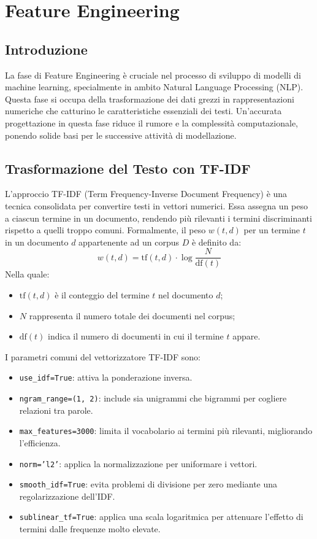 
\chapter{Feature Engineering}

\section{Introduzione}
La fase di Feature Engineering è cruciale nel processo di sviluppo di modelli di machine learning, specialmente in ambito Natural Language Processing (NLP). Questa fase si occupa della trasformazione dei dati grezzi in rappresentazioni numeriche che catturino le caratteristiche essenziali dei testi. Un’accurata progettazione in questa fase riduce il rumore e la complessità computazionale, ponendo solide basi per le successive attività di modellazione.

\section{Trasformazione del Testo con TF-IDF}
L'approccio TF-IDF (Term Frequency-Inverse Document Frequency) è una tecnica consolidata per convertire testi in vettori numerici. Essa assegna un peso a ciascun termine in un documento, rendendo più rilevanti i termini discriminanti rispetto a quelli troppo comuni.
Formalmente, il peso \(w(t,d)\) per un termine \(t\) in un documento \(d\) appartenente ad un corpus \(D\) è definito da:
\[
w(t,d) = \text{tf}(t,d) \cdot \log \frac{N}{\text{df}(t)}
\]
Nella quale:
\begin{itemize}
    \item \(\text{tf}(t,d)\) è il conteggio del termine \(t\) nel documento \(d\);
    \item \(N\) rappresenta il numero totale dei documenti nel corpus;
    \item \(\text{df}(t)\) indica il numero di documenti in cui il termine \(t\) appare.
\end{itemize}

I parametri comuni del vettorizzatore TF-IDF sono:
\begin{itemize}
    \item \texttt{use\_idf=True}: attiva la ponderazione inversa.
    \item \texttt{ngram\_range=(1, 2)}: include sia unigrammi che bigrammi per cogliere relazioni tra parole.
    \item \texttt{max\_features=3000}: limita il vocabolario ai termini più rilevanti, migliorando l'efficienza.
    \item \texttt{norm='l2'}: applica la normalizzazione per uniformare i vettori.
    \item \texttt{smooth\_idf=True}: evita problemi di divisione per zero mediante una regolarizzazione dell’IDF.
    \item \texttt{sublinear\_tf=True}: applica una scala logaritmica per attenuare l’effetto di termini dalle frequenze molto elevate.
\end{itemize}

